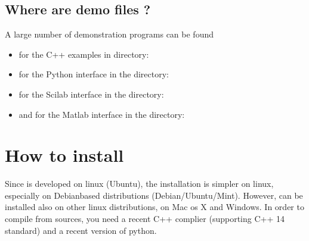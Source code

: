 \documentclass[a4paper,11pt,english]{sphinxmanual}
\begin{document}
\section{Where are demo files ?}
\label{\detokenize{tutorial/intro:where-are-demo-files}}
A large number of demonstration programs can be found
\begin{itemize}
\item {} 
for the C++ examples in directory:

\begin{sphinxVerbatim}[commandchars=\\\{\}]
\end{sphinxVerbatim}

\item {} 
for the Python interface in the directory:

\begin{sphinxVerbatim}[commandchars=\\\{\}]
\end{sphinxVerbatim}

\item {} 
for the Scilab interface in the directory:

\begin{sphinxVerbatim}[commandchars=\\\{\}]
\end{sphinxVerbatim}

\item {} 
and for the Matlab interface in the directory:

\begin{sphinxVerbatim}[commandchars=\\\{\}]
\end{sphinxVerbatim}

\end{itemize}


\chapter{How to install}
\label{\detokenize{tutorial/install:how-to-install}}\label{\detokenize{tutorial/install:ud-install-tut}}\label{\detokenize{tutorial/install::doc}}
Since  is developed on linux (Ubuntu), the installation is simpler on linux, especially on Debian\sphinxhyphen{}based distributions (Debian/Ubuntu/Mint). However,  can be installed also on other linux distributions, on Mac os X and Windows. In order to compile  from sources, you need a recent C++ complier (supporting C++ 14 standard) and a recent version of python.
\end{document}
